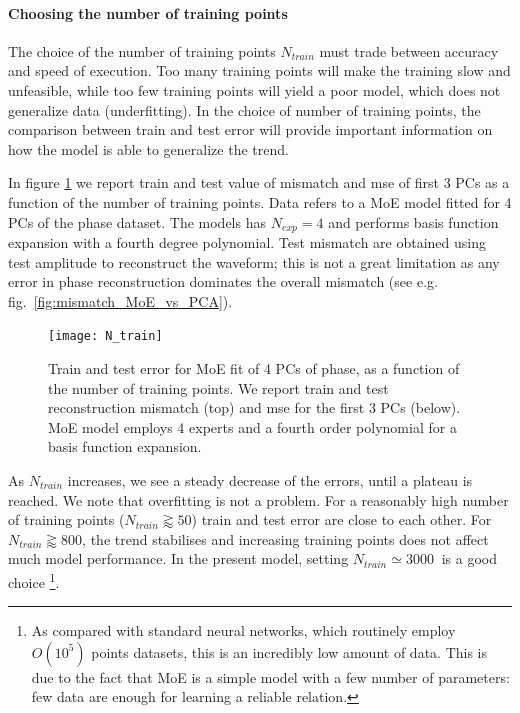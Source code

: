 \paragraph{Choosing the number of training points}
The choice of the number of training points $N_{train}$ must trade between accuracy and speed of execution. Too many training points will make the training slow and unfeasible, while too few training points will yield a poor model, which does not generalize data (underfitting).
In the choice of number of training points, the comparison between train and test error will provide important information on how the model is able to generalize the trend.
\par
In figure \ref{fig:N_train} we report train and test value of mismatch and mse of first 3 PCs as a function of the number of training points. Data refers to a MoE model fitted for 4 PCs of the phase dataset. The models has ${N_{exp} = 4}$ and performs basis function expansion with a fourth degree polynomial. Test mismatch are obtained using test amplitude to reconstruct the waveform; this is not a great limitation as any error in phase reconstruction dominates the overall mismatch (see e.g. fig.~\ref{fig:mismatch_MoE_vs_PCA}).
\begin{figure}
	\centering
    \texttt{[image: N\_train]}
	\caption{Train and test error for MoE fit of 4 PCs of phase, as a function of the number of training points. We report train and test reconstruction mismatch (top) and mse for the first 3 PCs (below).
    MoE model employs 4 experts and a fourth order polynomial for a basis function expansion.
    }
	\label{fig:N_train}
\end{figure}
\par
As $N_{train}$ increases, we see a steady decrease of the errors, until a plateau is reached.
We note that overfitting is not a problem. For a reasonably high number of training points ($N_{train} \gtrapprox 50$) train and test error are close to each other.
For $N_{train} \gtrapprox 800$, the trend stabilises and increasing training points does not affect much model performance.
In the present model, setting $N_{train} \simeq \SI{3000}{}$ is a good choice
\footnote{As compared with standard neural networks, which routinely employ $O(10^5)$ points datasets, this is an incredibly low amount of data. This is due to the fact that MoE is a simple model with a few number of parameters: few data are enough for learning a reliable relation.}.
